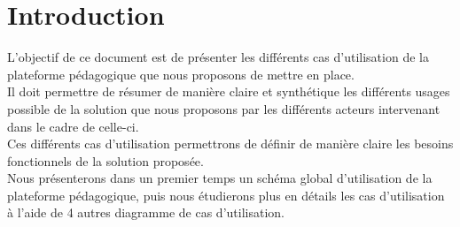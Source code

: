 \section*{Introduction}

L’objectif de ce document est de présenter les différents cas d’utilisation de la plateforme pédagogique que nous proposons de mettre en place.\\

Il doit permettre de résumer de manière claire et synthétique les différents usages possible de la solution que nous proposons par les différents acteurs intervenant dans le cadre de celle-ci.\\

Ces différents cas d’utilisation permettrons de définir de manière claire les besoins fonctionnels de la solution proposée.\\

Nous présenterons dans un premier temps un schéma global d’utilisation de la plateforme pédagogique, puis nous étudierons plus en détails les cas d’utilisation à l’aide de 4 autres diagramme de cas d’utilisation.\\
